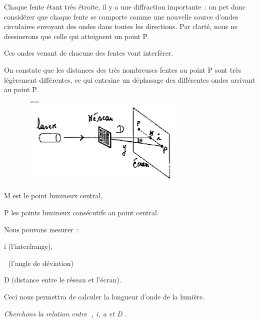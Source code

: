 Chaque fente étant très étroite, il y a une diffraction importante~: on
pet donc considérer que chaque fente se comporte comme une nouvelle
source d'ondes circulaires envoyant des ondes dans toutes les
directions. Par clarté, nous ne dessinerons que celle qui atteignent un
point P.

Ces ondes venant de chacune des fentes vont interférer.

On constate que les distances des très nombreuses fentes au point P sont
très légèrement différentes, ce qui entraine un déphasage des
différentes ondes arrivant au point P.

\begin{figure}
\centering
\includegraphics[width=8.348cm,height=4.235cm]{Pictures/10000001000000F800000088FE88597F2483A271.png}
\caption{}
\end{figure}

M est le point lumineux central,

P les points lumineux consécutifs au point central.

Nous pouvons mesurer~:

i (l'interfrange),

 (l'angle de déviation)

D (distance entre le réseau et l'écran).

Ceci nous permettra de calculer la longueur d'onde de la lumière.

\emph{Cherchons la relation entre , i, a et D . }


